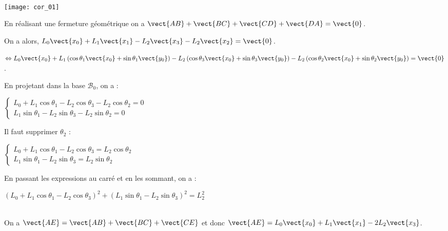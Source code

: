 \begin{multicols}{2}
\begin{multicols}{2}
\ifprof
\begin{corrige}~\\
\begin{center}
\texttt{[image: cor\_01]}
\end{center}

En réalisant une fermeture géométrique on a $\vect{AB}+\vect{BC}+\vect{CD}+\vect{DA}=\vect{0}$.

On a alors, $L_0\vect{x_0}+L_1\vect{x_1}-L_2\vect{x_3}-L_2\vect{x_2}=\vect{0}$.

$\Leftrightarrow L_0\vect{x_0}+L_1\left( \cos \theta_1 \vect{x_0}+ \sin \theta_1 \vect{y_0} \right)-L_2\left( \cos \theta_3\vect{x_0} + \sin \theta_3\vect{y_0}  \right)-L_2\left( \cos \theta_2\vect{x_0} + \sin \theta_2\vect{y_0}  \right)=\vect{0}$.

En projetant dans la base $\mathcal{B}_0$, on a :

$
\left\{
\begin{array}{l}
L_0 + L_1 \cos \theta_1 -L_2\cos \theta_3-L_2 \cos \theta_2=0 \\
L_1\sin \theta_1-L_2 \sin \theta_3-L_2 \sin \theta_2=0 
\end{array} \right.
$

Il faut supprimer $\theta_2$ :

$
\left\{
\begin{array}{l}
L_0 + L_1 \cos \theta_1 -L_2\cos \theta_3=L_2 \cos \theta_2 \\
L_1\sin \theta_1-L_2 \sin \theta_3=L_2 \sin \theta_2
\end{array} \right.
$

En passant les expressions au carré et en les sommant, on a :

$\left(L_0 + L_1 \cos \theta_1 -L_2\cos \theta_3\right)^2 + \left( L_1\sin \theta_1-L_2 \sin \theta_3\right)^2=L_2^2 $


\end{corrige}
\else
\fi

\ifprof
\begin{corrige}~\\
On a $\vect{AE}=\vect{AB}+\vect{BC}+\vect{CE}$ et donc 
 $\vect{AE}=L_0\vect{x_0}+L_1 \vect{x_1} -2L_2\vect{x_3}$. 
 

\end{corrige}
\end{multicols}
\end{multicols}
